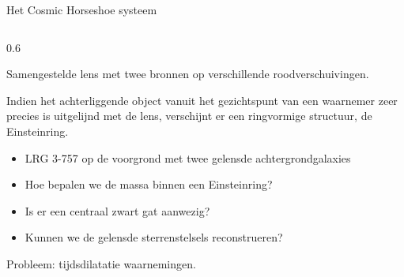 \documentclass[aspectratio=169,xcolor=dvipsnames]{beamer}
\begin{document}
\begin{frame}{Het Cosmic Horseshoe systeem}
    \begin{columns}[T] %

        \begin{column}{0.6\textwidth}
            \small



            Samengestelde lens met twee bronnen op verschillende roodverschuivingen.
            \vspace{0.2cm}

            Indien het achterliggende object vanuit het gezichtspunt van een waarnemer zeer precies is uitgelijnd met de lens, verschijnt er een ringvormige structuur, de Einsteinring.

            \vspace{0.4cm}
            \begin{itemize}
                \item LRG 3-757 op de voorgrond met twee gelensde achtergrondgalaxies
                \item Hoe bepalen we de massa binnen een Einsteinring?
                \item Is er een centraal zwart gat aanwezig?
                \item Kunnen we de gelensde sterrenstelsels reconstrueren?
            \end{itemize}

            \vspace{0.4cm}
             Probleem: tijdsdilatatie waarnemingen.
        \end{column}


\end{columns}
\end{frame}
\end{document}
